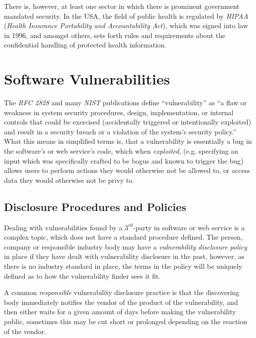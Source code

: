 \documentclass[a4paper,12pt]{article}
\begin{document}
	There is, however, at least one sector in which there is prominent government mandated security. In the USA, the field of public health is regulated by \textit{HIPAA} (\textit{Health Insurance Portability and Accountability Act}), which was signed into law\cite{hipaa96} in 1996, and amongst others, sets forth rules and requirements about the confidential handling of protected health information.

\section{Software Vulnerabilities}
 
	
	The \textit{RFC 2828} and many \textit{NIST} publications define ``vulnerability'' as ``a flaw or weakness in system security procedures, design, implementation, or internal controls that could be exercised (accidentally triggered or intentionally exploited) and result in a security breach or a violation of the system's security policy.''\cite{rfc2828,nist80030} What this means in simplified terms is, that a vulnerability is essentially a bug in the software's or web service's code, which when \textit{exploited}, (e.g. specifying an input which was specifically crafted to be bogus and known to trigger the bug) allows users to perform actions they would otherwise not be allowed to, or access data they would otherwise not be privy to.
	
\subsection{Disclosure Procedures and Policies}
 
	
	Dealing with vulnerabilities found by a $3^{rd}$-party in software or web service is a complex topic, which does not have a standard procedure defined. The person, company or responsible industry body may have a \textit{vulnerability disclosure policy} in place if they have dealt with vulnerability disclosure in the past, however, as there is no industry standard in place, the terms in the policy will be uniquely defined as to how the vulnerability finder sees it fit.
	
	A common \textit{responsible} vulnerability disclosure practice is that the discovering body immediately notifies the vendor of the product of the vulnerability, and then either waits for a given amount of days before making the vulnerability public, sometimes this may be cut short or prolonged depending on the reaction of the vendor.
	
\end{document}
